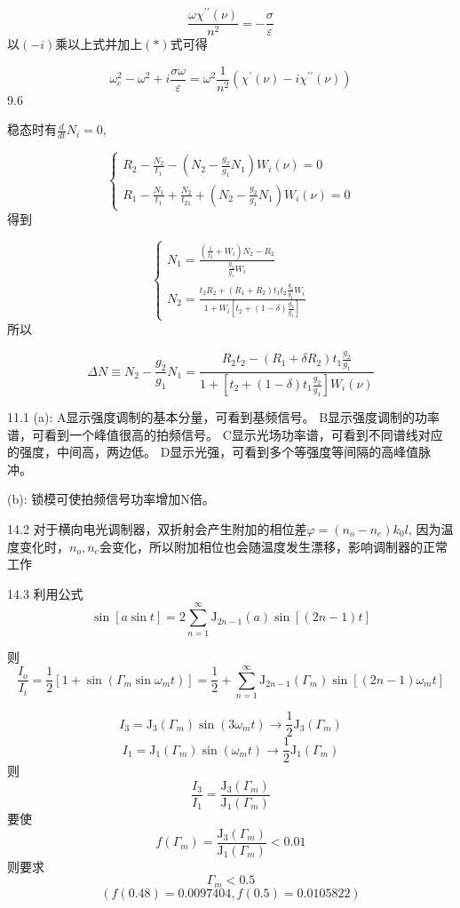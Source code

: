 \[\frac{\omega\chi^{\prime \prime}(\nu)}{n^{2}}=-\frac{\sigma}{\varepsilon} \]
以\((-i)\)乘以上式并加上\((*)\)式可得

\[\omega_{c}^{2}-\omega^{2}+i \frac{\sigma \omega}{\varepsilon}=\omega^{2} \frac{1}{n^{2}}\left(\chi^{\prime}(\nu)-i \chi^{\prime \prime}(\nu)\right) \]
9.6

稳态时有\(\frac{d}{d t} N_{i}=0\),

\[\left\{\begin{array}{l}{R_{2}-\frac{N_{2}}{t_{1}}-\left(N_{2}-\frac{g_{2}}{g_{1}} N_{1}\right) W_{i}(\nu)=0} \\ {R_{1}-\frac{N_{1}}{t_{1}}+\frac{N_{2}}{t_{21}}+\left(N_{2}-\frac{g_{2}}{g_{1}} N_{1}\right) W_{i}(\nu)=0}\end{array}\right. \]
得到

\[\left\{\begin{array}{l}{N_{1}=\frac{\left(\frac{1}{t_{2}}+W_{i}\right) N_{2}-R_{2}}{\frac{g_{2}}{g_{1}} W_{i}}} \\ {N_{2}=\frac{t_{2} R_{2}+\left(R_{1}+R_{2}\right) t_{1}t_2\frac{g_{2}}{g_{1}} W_{i}}{1+W_{i}\left[t_{2}+(1-\delta) \frac{g_{2}}{g_{1}}\right]}}\end{array}\right. \]
所以

\[\Delta N \equiv N_{2}-\frac{g_{2}}{g_{1}} N_{1}=\frac{R_{2} t_{2}-\left(R_{1}+\delta R_{2}\right) t_{1} \frac{g_{2}}{g_{1}}}{1+\left[t_{2}+(1-\delta) t_{1} \frac{g_{2}}{g_{1}}\right] W_{i}(\nu)} \]


11.1
(a): 
A显示强度调制的基本分量，可看到基频信号。
B显示强度调制的功率谱，可看到一个峰值很高的拍频信号。
C显示光场功率谱，可看到不同谱线对应的强度，中间高，两边低。
D显示光强，可看到多个等强度等间隔的高峰值脉冲。

(b):
锁模可使拍频信号功率增加N倍。



14.2
对于横向电光调制器，双折射会产生附加的相位差$\varphi=(n_o-n_e)k_0l$, 因为温度变化时，$n_o,n_e$会变化，所以附加相位也会随温度发生漂移，影响调制器的正常工作

14.3
利用公式
$$
\sin [a\sin t]=2\sum_{n=1}^{\infty}\mathrm{J}_{2n-1}(a)\sin[(2n-1)t]
$$

则
$$
\frac{I_o}{I_i}=\frac{1}{2}\left[1+\sin\left(\Gamma_m\sin \omega_m t\right)\right]
=\frac{1}{2}+\sum_{n=1}^{\infty}\mathrm{J}_{2n-1}(\Gamma_m)\sin[(2n-1)\omega_mt]
$$

$$
I_3=\mathrm{J}_3(\Gamma_m)\sin(3\omega_mt)  \to \frac{1}{2}\mathrm{J}_3(\Gamma_m)
$$
$$
I_1=\mathrm{J}_1(\Gamma_m)\sin(\omega_mt) \to \frac{1}{2}\mathrm{J}_1(\Gamma_m)
$$
则
$$
\frac{I_3}{I_1}=\frac{\mathrm{J}_3(\Gamma_m)}{\mathrm{J}_1(\Gamma_m)}
$$
要使
$$
f(\Gamma_m)=\frac{\mathrm{J}_3(\Gamma_m)}{\mathrm{J}_1(\Gamma_m)}<0.01
$$
则要求
$$
\Gamma_m<0.5
$$
$$
\left(f(0.48)=0.0097404,f(0.5)=0.0105822\right)
$$


